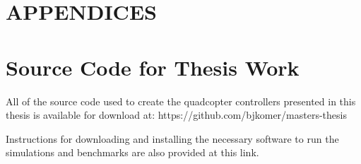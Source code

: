\documentclass[letterpaper,12pt,titlepage,oneside,final]{book}
\let\origdoublepage\cleardoublepage
\newcommand{\clearemptydoublepage}{%
  \clearpage{\pagestyle{empty}\origdoublepage}}
\let\cleardoublepage\clearemptydoublepage
\begin{document}
\appendix

\chapter*{APPENDICES}
\chapter[Link to the Source Code]{Source Code for Thesis Work}
\label{AppendixA}

All of the source code used to create the quadcopter controllers presented in this thesis is available for download at: https://github.com/bjkomer/masters-thesis

Instructions for downloading and installing the necessary software to run the simulations and benchmarks are also provided at this link.




\cleardoublepage %
\renewcommand*{\bibname}{References}




\nocite{*}
\end{document}

